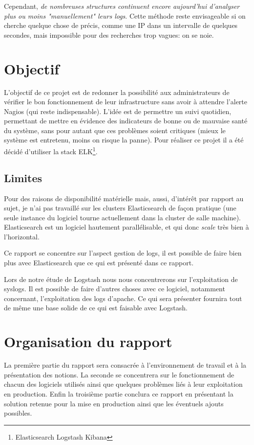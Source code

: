 \documentclass[a4paper,12pt,one side,titlepage]{report}
\begin{document}
Cependant, \emph{de nombreuses structures continuent encore aujourd'hui d'analyser 
plus ou moins "manuellement" leurs \emph{\gls{logs}}}. Cette méthode reste envisageable 
si on cherche quelque chose de précis, comme une IP dans un intervalle de quelques 
secondes, mais impossible pour des recherches trop vagues: on se noie.


\section{Objectif}
L'objectif de ce projet est de redonner la possibilité aux administrateurs
de vérifier le bon fonctionnement de leur infrastructure sans avoir à attendre l'alerte
Nagios (qui reste indispensable). L'idée est de permettre un suivi quotidien, permettant
de mettre en évidence des indicateurs de bonne ou de mauvaise santé du système, sans 
pour autant que ces problèmes soient critiques (mieux le système est entretenu, moins
on risque la panne).
Pour réaliser ce projet il a été décidé d'utiliser la stack ELK\footnote{Elasticsearch Logstash Kibana}.



\subsection{Limites}
Pour des raisons de disponibilité matérielle mais, aussi, d'intérêt par rapport au sujet,
je n'ai pas travaillé sur les clusters Elasticsearch de façon pratique (une seule 
instance du logiciel tourne actuellement dans la cluster de salle machine). Elasticsearch
est un logiciel hautement parallélisable, et qui donc \textit{scale} très bien à 
l'horizontal. 

Ce rapport se concentre sur l'aspect gestion de logs, il est possible de faire bien
plus avec Elasticsearch que ce qui est présenté dans ce rapport.

Lors de notre étude de Logstash nous nous concentrerons sur l'exploitation de syslogs. 
Il est possible de faire d'autres choses avec ce logiciel, notamment concernant, 
l'exploitation des logs d'apache. 
Ce qui sera présenter fournira tout de même une base solide de ce qui est faisable 
avec Logstash.


\section{Organisation du rapport}
La première partie du rapport sera consacrée à l'environnement de travail et à la 
présentation des notions. La seconde se concentrera sur le fonctionnement de chacun 
des logiciels utilisés ainsi que quelques problèmes liés à leur exploitation en production.
Enfin la troisième partie conclura ce rapport en présentant la solution retenue 
pour la mise en production ainsi que les éventuels ajouts possibles.
\end{document}
